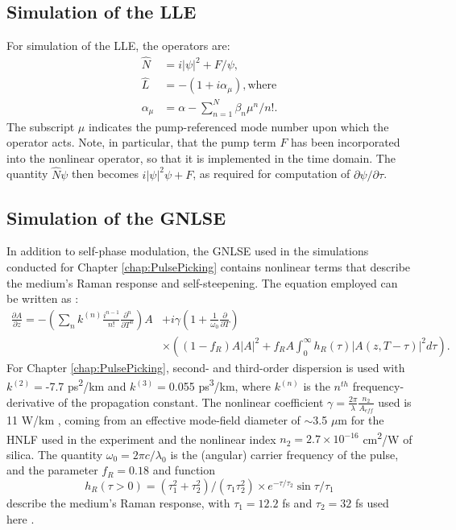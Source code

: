 \subsection{Simulation of the LLE}
For simulation of the LLE, the operators are: 
\begin{align}
\hat{N}&=i|\psi|^2+F/\psi,\\
\hat{L}&=-(1+i\alpha_\mu), \text{where}\\
\alpha_\mu&=\alpha-\sum_{n=1}^N\beta_n\mu^n/n!.
\end{align}
The subscript $\mu$ indicates the pump-referenced mode number upon which the operator acts. Note, in particular, that the pump term $F$ has been incorporated into the nonlinear operator, so that it is implemented in the time domain. The quantity $\hat{N}\psi$ then becomes $i|\psi|^2\psi+F$, as required for computation of $\partial\psi/\partial\tau$.

\subsection{Simulation of the GNLSE}

In addition to self-phase modulation, the GNLSE used in the simulations conducted for Chapter \ref{chap:PulsePicking} contains nonlinear terms that describe the medium's Raman response and self-steepening. The equation employed can be written as \cite{Hult2007,Agrawal2007}:
\begin{align}
\frac{\partial A}{\partial z}=-\left(\sum_n k^{(n)} \frac{i^{n-1}}{n!} \frac{\partial^n}{\partial T^n}\right)A&+i\gamma\left(1+\frac{1}{\omega_0}\frac{\partial}{\partial T}\right) \nonumber \\
&\times\left((1-f_R)A|A|^2+f_R A\int_0^\infty h_R(\tau)|A(z,T-\tau)|^2 d\tau\right).
\end{align}
For Chapter \ref{chap:PulsePicking}, second- and third-order dispersion is used with $k^{(2)}=$-7.7 ps\textsuperscript{2}/km and $k^{(3)}=$0.055 ps\textsuperscript{3}/km, where $k^{(n)}$ is the $n^{th}$ frequency-derivative of the propagation constant. The nonlinear coefficient $\gamma=\frac{2\pi}{\lambda}\frac{n_2}{A_{eff}}$ used is 11 W/km \cite{Hirano2009}, coming from an effective mode-field diameter of $\sim$3.5 $\mu$m for the HNLF used in the experiment and the nonlinear index $n_2=2.7\times10^{-16}$ cm\textsuperscript{2}/W of silica. The quantity $\omega_0=2\pi c/\lambda_0$ is the (angular) carrier frequency of the pulse, and the parameter $f_R=0.18$ and function
\begin{equation}
h_R(\tau>0)=(\tau_1^2+\tau_2^2)/(\tau_1 \tau_2^2)\times e^{-\tau/\tau_2}\sin{\tau/\tau_1}
\end{equation} 
describe the medium's Raman response, with $\tau_1=12.2$ fs and $\tau_2=32$ fs used here \cite{Agrawal2007,Hult2007,Blow1989}.

